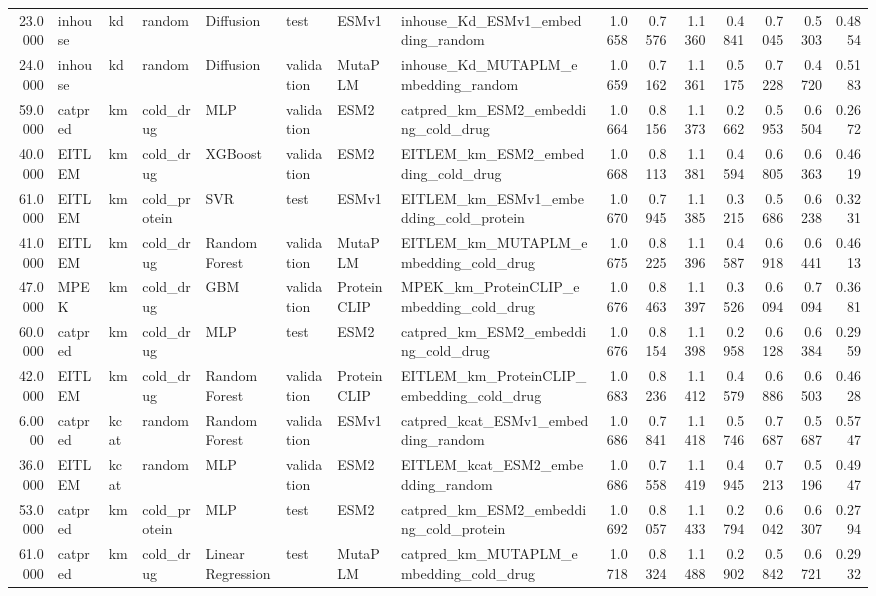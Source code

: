\begin{tabular}{rlllllllrrrrrrr}
23.0000 & inhouse & kd & random & Diffusion & test & ESMv1 & inhouse_Kd_ESMv1_embedding_random & 1.0658 & 0.7576 & 1.1360 & 0.4841 & 0.7045 & 0.5303 & 0.4854 \\
24.0000 & inhouse & kd & random & Diffusion & validation & MutaPLM & inhouse_Kd_MUTAPLM_embedding_random & 1.0659 & 0.7162 & 1.1361 & 0.5175 & 0.7228 & 0.4720 & 0.5183 \\
59.0000 & catpred & km & cold_drug & MLP & validation & ESM2 & catpred_km_ESM2_embedding_cold_drug & 1.0664 & 0.8156 & 1.1373 & 0.2662 & 0.5953 & 0.6504 & 0.2672 \\
40.0000 & EITLEM & km & cold_drug & XGBoost & validation & ESM2 & EITLEM_km_ESM2_embedding_cold_drug & 1.0668 & 0.8113 & 1.1381 & 0.4594 & 0.6805 & 0.6363 & 0.4619 \\
61.0000 & EITLEM & km & cold_protein & SVR & test & ESMv1 & EITLEM_km_ESMv1_embedding_cold_protein & 1.0670 & 0.7945 & 1.1385 & 0.3215 & 0.5686 & 0.6238 & 0.3231 \\
41.0000 & EITLEM & km & cold_drug & Random Forest & validation & MutaPLM & EITLEM_km_MUTAPLM_embedding_cold_drug & 1.0675 & 0.8225 & 1.1396 & 0.4587 & 0.6918 & 0.6441 & 0.4613 \\
47.0000 & MPEK & km & cold_drug & GBM & validation & ProteinCLIP & MPEK_km_ProteinCLIP_embedding_cold_drug & 1.0676 & 0.8463 & 1.1397 & 0.3526 & 0.6094 & 0.7094 & 0.3681 \\
60.0000 & catpred & km & cold_drug & MLP & test & ESM2 & catpred_km_ESM2_embedding_cold_drug & 1.0676 & 0.8154 & 1.1398 & 0.2958 & 0.6128 & 0.6384 & 0.2959 \\
42.0000 & EITLEM & km & cold_drug & Random Forest & validation & ProteinCLIP & EITLEM_km_ProteinCLIP_embedding_cold_drug & 1.0683 & 0.8236 & 1.1412 & 0.4579 & 0.6886 & 0.6503 & 0.4628 \\
6.0000 & catpred & kcat & random & Random Forest & validation & ESMv1 & catpred_kcat_ESMv1_embedding_random & 1.0686 & 0.7841 & 1.1418 & 0.5746 & 0.7687 & 0.5687 & 0.5747 \\
36.0000 & EITLEM & kcat & random & MLP & validation & ESM2 & EITLEM_kcat_ESM2_embedding_random & 1.0686 & 0.7558 & 1.1419 & 0.4945 & 0.7213 & 0.5196 & 0.4947 \\
53.0000 & catpred & km & cold_protein & MLP & test & ESM2 & catpred_km_ESM2_embedding_cold_protein & 1.0692 & 0.8057 & 1.1433 & 0.2794 & 0.6042 & 0.6307 & 0.2794 \\
61.0000 & catpred & km & cold_drug & Linear Regression & test & MutaPLM & catpred_km_MUTAPLM_embedding_cold_drug & 1.0718 & 0.8324 & 1.1488 & 0.2902 & 0.5842 & 0.6721 & 0.2932 \\

\end{tabular}
